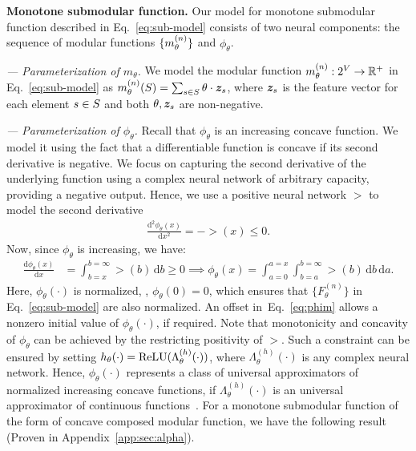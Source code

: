 \documentclass{article}
\newcommand{\ehdr}[1]{\noindent\emph{#1.}}
\newcommand{\xhdr}[1]{\noindent\textbf{#1.}}
\def\d{\mathrm{d}}
\renewcommand{\cite}{\citep}
\begin{document}
\xhdr{Monotone submodular function}
Our model for monotone submodular function described in Eq.~\eqref{eq:sub-model} consists of two neural components: the sequence of modular functions $\{m^{(n)} _{\theta}\}$ and $\phi_{\theta}$.

\ehdr{--- Parameterization of $m_{\theta}$} 
We model the modular function $m_{\theta}^{(n)}: 2^V \to \mathbb{R}^+$ in Eq.~\eqref{eq:sub-model} as $m_\theta^{(n)}(S)=\sum_{s\in S} \theta \cdot \bm{z}_s$, where  $\bm{z}_s$ is the feature vector  for each element $s\in S$ and both $\theta, \bm{z}_s$ are non-negative. 

\ehdr{--- Parameterization of $\phi_{\theta}$} Recall that $\phi_{\theta} $ is an increasing concave function. We model it using the fact that a differentiable  function is concave if its second derivative is negative.  We focus on capturing the second derivative of the underlying function using a complex neural network of arbitrary capacity, providing a negative output. Hence, we use a positive neural network $\gt$ to model  the second derivative
\begin{align}
    \frac{\d^2\phi_{\theta}(x)}{\d x^2} = -\gt(x)\le 0.
\end{align}
Now, since $\phi_{\theta}$ is increasing, we have:
\begin{align}
    \frac{\d \phi_{\theta}(x)}{\d x} &=
    \int_{b=x}^ {b=\infty} \gt(b) \, \d b    \ge 0 
\implies \phi_{\theta}(x) = \int_{a=0} ^{a=x} \int_{b=a} ^{b=\infty} \gt(b) \, \d b \, \d a.   \label{eq:phim}
\end{align}
Here, $\phi_{\theta}(\cdot)$ is normalized, \ie, $\phi_{\theta}(0)=0$, which ensures that $\{F_{\theta}^{(n)}\}$ in Eq.~\eqref{eq:sub-model} are also  normalized. An offset in~Eq.~\eqref{eq:phim}  allows a nonzero initial value of $\phi_{\theta}(\cdot)$, if  required.
Note that  monotonicity and concavity of $\phi_{\theta}$ can be achieved by the restricting positivity of $\gt$.
Such a constraint  can be ensured by setting $h_{\theta}(\cdot)=\text{ReLU}(\Lambda^{(h)} _{\theta}(\cdot))$, where $\Lambda^{(h)} _{\theta}(\cdot)$ is any complex neural network.  Hence, $\phi_{\theta}(\cdot)$ represents a class of universal approximators of normalized increasing concave functions, if $\Lambda^{(h)}  _{\theta}(\cdot)$ is an universal approximator of continuous functions~\cite{hornik1989multilayer}. For a monotone submodular function of the form of concave composed modular function, we have the following result (Proven in Appendix~\ref{app:sec:alpha}).
\end{document}

